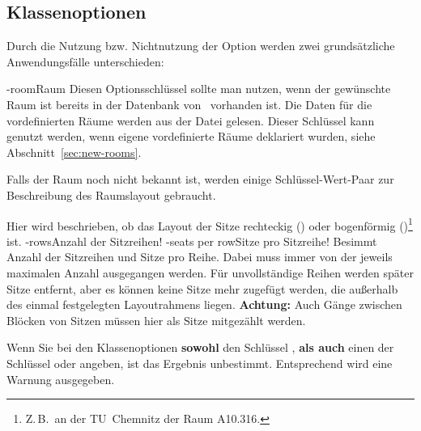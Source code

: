 \documentclass[
babel-options={ngerman},
load-preamble-,
scrartcl={headings=small}
]{cnltx-doc}
\providecommand{\packagename}{seatingchart}
\def\thepkg{\pkg*{\packagename}}
\begin{document}
\subsection{Klassenoptionen}
\label{sec:class-options}
Durch die Nutzung bzw. Nichtnutzung der Option  werden zwei
grundsätzliche Anwendungsfälle unterschieden:
\begin{options}
  \keyval-{room}{Raum}\Default{}
  Diesen Optionsschlüssel sollte man nutzen, wenn der gewünschte
  Raum ist bereits in der Datenbank von \thepkg\ vorhanden ist.
  Die Daten für die vordefinierten Räume werden
  aus der Datei  gelesen. 
  Dieser Schlüssel kann genutzt werden, wenn eigene vordefinierte Räume deklariert
  wurden, siehe Abschnitt~\ref{sec:new-rooms}.
\end{options}
Falls der Raum noch nicht bekannt ist, werden einige Schlüssel-Wert-Paar zur
Beschreibung des Raumslayout gebraucht.
\begin{options}
  Hier wird beschrieben, ob das Layout der Sitze rechteckig
  () oder bogenförmig ()\footnote{Z.\,B.\ an der
    TU~Chemnitz der Raum A10.316.} ist.
  \keyval-{rows}{Anzahl der Sitzreihen}\Default*!{}\vspace{-.3\baselineskip}
  \keyval-{seats per row}{Sitze pro Sitzreihe}\Default!{}
  Besimmt Anzahl der Sitzreihen und Sitze pro Reihe. Dabei muss immer von der
  jeweils maximalen Anzahl ausgegangen werden. Für unvollständige Reihen werden später Sitze
  entfernt, aber es können keine Sitze mehr zugefügt werden, die außerhalb des einmal
  festgelegten Layoutrahmens liegen. \textbf{Achtung:} Auch Gänge zwischen
  Blöcken von Sitzen müssen hier als Sitze mitgezählt werden.
\end{options}
Wenn Sie bei den Klassenoptionen \textbf{sowohl} den Schlüssel , \textbf{als auch}
einen der Schlüssel  oder  angeben, ist das Ergebnis
unbestimmt. Entsprechend wird eine Warnung ausgegeben.\medskip
\end{document}
